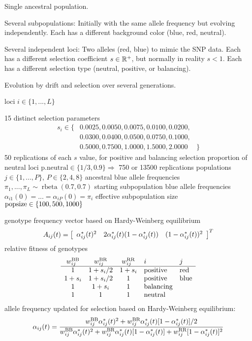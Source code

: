 \documentclass[a4paper,12pt]{article}
\begin{document}
 Single ancestral population.

 Several subpopulations:
   Initially with the same allele frequency but evolving
    independently.
   Each has a different background color (blue, red, neutral).

 Several independent loci:
   Two alleles (red, blue) to mimic the SNP data.
   Each has a different selection coefficient $s\in \mathbb R^+$, but
    normally in reality $s<1$.
   Each has a different selection type (neutral, positive, or balancing).

 Evolution by drift and selection over several generations.


 loci $i \in \{1, ...,  L\}$

 15 distinct selection parameters 
$$
\begin{array}{lll}
s_i\in \{ & 0.0025,0.0050,0.0075,0.0100,0.0200,\\
          & 0.0300,0.0400,0.0500,0.0750,0.1000,\\
          & 0.5000,0.7500,1.0000,1.5000,2.0000 & \}
\end{array}
$$
 50 replications of each $s$ value, for positive and balancing selection
 proportion of neutral loci $\text{p.neutral}\in\{1/3,0.9\}
  \Rightarrow$ 750 or 13500 replications
 populations $j\in\{1, ..., P\}$, $P\in \{2,4,8\}$
 ancestral blue allele frequencies $\pi_1, ..., \pi_L\sim
  \operatorname{rbeta}(0.7,0.7)$
 starting subpopulation blue allele frequencies $\alpha_{i1}(0) = ... = \alpha_{iP}(0) = \pi_i $
 effective subpopulation size $\text{popsize}\in\{100,500,1000\}$

 genotype frequency vector based on Hardy-Weinberg equilibrium
$$ A_{ij}(t) = 
\left[
\begin{array}{ccc}
\alpha_{ij}^*(t)^2 & 2\alpha_{ij}^*(t)(1-\alpha_{ij}^*(t)) & (1-\alpha_{ij}^*(t))^2
\end{array}
\right]^T$$
 relative fitness of genotypes 
$$
\begin{array}{cccll}
w_{ij}^{\text{BB}} & w_{ij}^{\text{BR}} & w_{ij}^{\text{RR}} & i & j\\
\hline
1 & 1+s_i/2 & 1+s_i & \text{positive}& \text{red}\\
1+s_i & 1+s_i/2 & 1 & \text{positive}& \text{blue}\\
1 & 1+s_i & 1 & \text{balancing}& \\
1 & 1 & 1 & \text{neutral}& 
\end{array}
$$
 allele frequency updated for selection based on Hardy-Weinberg equilibrium:
$$\alpha_{ij}(t) = \frac{
w_{ij}^{\text{BB}}\alpha_{ij}^*(t)^2 + w_{ij}^{\text{BR}}\alpha_{ij}^*(t)[1-\alpha_{ij}^*(t)]/2 }{
w_{ij}^{\text{BB}}\alpha_{ij}^*(t)^2 + w_{ij}^{\text{BR}}\alpha_{ij}^*(t)[1-\alpha_{ij}^*(t)] + w_{ij}^{\text{RR}}[1-\alpha_{ij}^*(t)]^2
   }$$
\end{document}
